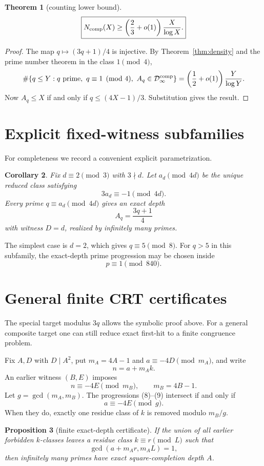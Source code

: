 \documentclass[11pt]{article}
\newtheorem{theorem}{Theorem}
\newtheorem{proposition}[theorem]{Proposition}
\newtheorem{corollary}[theorem]{Corollary}
\theoremstyle{definition}
\begin{document}
\begin{theorem}[counting lower bound]\label{thm:count}
\[
\boxed{
N_{\rm comp}(X)\ge\left(\frac23+o(1)\right)\frac{X}{\log X}.
}
\]
\end{theorem}

\begin{proof}
The map $q\mapsto(3q+1)/4$ is injective.  By Theorem~\ref{thm:density} and the prime number theorem in the class $1\pmod4$,
\[
\#\{q\le Y:q\text{ prime},\ q\equiv1\pmod4,\ A_q\in\mathcal D^{\rm comp}_\infty\}
=\left(\frac12+o(1)\right)\frac{Y}{\log Y}.
\]
Now $A_q\le X$ if and only if $q\le(4X-1)/3$.  Substitution gives the result.
\end{proof}

\section{Explicit fixed-witness subfamilies}
For completeness we record a convenient explicit parametrization.

\begin{corollary}
Fix $d\equiv2\pmod3$ with $3\nmid d$.  Let $a_d\pmod{4d}$ be the unique reduced class satisfying
\[
3a_d\equiv-1\pmod{4d}.
\]
Every prime $q\equiv a_d\pmod{4d}$ gives an exact depth
\[
A_q=\frac{3q+1}{4}
\]
with witness $D=d$, realized by infinitely many primes.
\end{corollary}

The simplest case is $d=2$, which gives $q\equiv5\pmod8$.  For $q>5$ in this subfamily, the exact-depth prime progression may be chosen inside
\[
p\equiv1\pmod{840}.
\]

\section{General finite CRT certificates}
The special target modulus $3q$ allows the symbolic proof above.  For a general composite target one can still reduce exact first-hit to a finite congruence problem.

Fix $A,D$ with $D\mid A^2$, put $m_A=4A-1$ and $a\equiv-4D\pmod{m_A}$, and write
\[
n=a+m_Ak. \tag{8}
\]
An earlier witness $(B,E)$ imposes
\[
n\equiv-4E\pmod{m_B},
\qquad m_B=4B-1. \tag{9}
\]
Let $g=\gcd(m_A,m_B)$.  The progressions (8)--(9) intersect if and only if
\[
a\equiv-4E\pmod g.
\]
When they do, exactly one residue class of $k$ is removed modulo $m_B/g$.

\begin{proposition}[finite exact-depth certificate]
If the union of all earlier forbidden $k$-classes leaves a residue class $k\equiv r\pmod L$ such that
\[
\gcd(a+m_Ar,m_AL)=1,
\]
then infinitely many primes have exact square-completion depth $A$.
\end{proposition}
\end{document}
